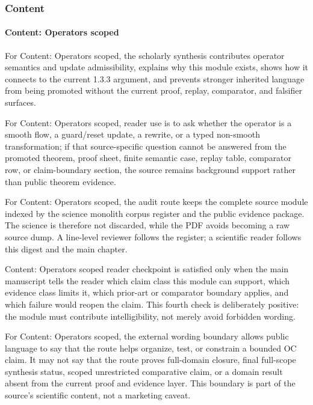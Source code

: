 \subsubsection{Content}

\paragraph{Content: Operators scoped}

For Content: Operators scoped, the scholarly synthesis contributes operator semantics and update admissibility, explains why this module exists, shows how it connects to the current 1.3.3 argument, and prevents stronger inherited language from being promoted without the current proof, replay, comparator, and falsifier surfaces.


For Content: Operators scoped, reader use is to ask whether the operator is a smooth flow, a guard/reset update, a rewrite, or a typed non-smooth transformation; if that source-specific question cannot be answered from the promoted theorem, proof sheet, finite semantic case, replay table, comparator row, or claim-boundary section, the source remains background support rather than public theorem evidence.


For Content: Operators scoped, the audit route keeps the complete source module indexed by the science monolith corpus register and the public evidence package. The science is therefore not discarded, while the PDF avoids becoming a raw source dump. A line-level reviewer follows the register; a scientific reader follows this digest and the main chapter.


Content: Operators scoped reader checkpoint is satisfied only when the main manuscript tells the reader which claim class this module can support, which evidence class limits it, which prior-art or comparator boundary applies, and which failure would reopen the claim. This fourth check is deliberately positive: the module must contribute intelligibility, not merely avoid forbidden wording.


For Content: Operators scoped, the external wording boundary allows public language to say that the route helps organize, test, or constrain a bounded OC claim. It may not say that the route proves full-domain closure, final full-scope synthesis status, scoped unrestricted comparative claim, or a domain result absent from the current proof and evidence layer. This boundary is part of the source's scientific content, not a marketing caveat.


